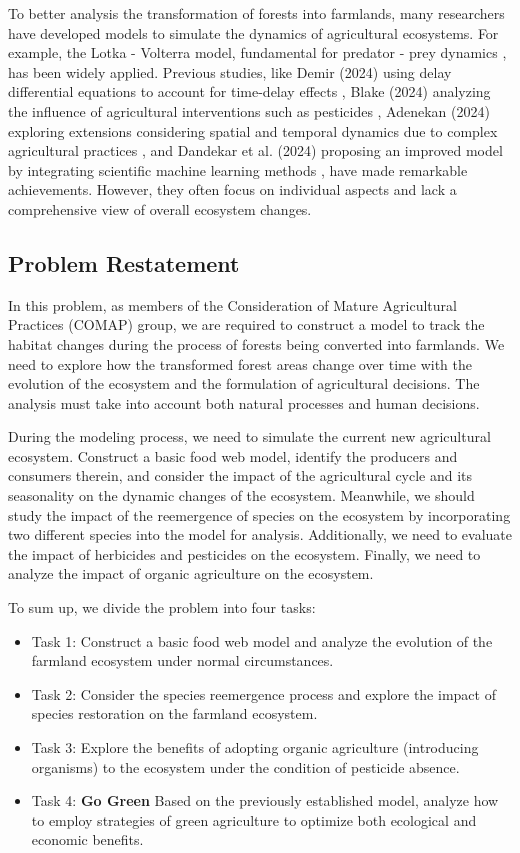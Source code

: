 \documentclass[12pt]{article}  %
\begin{document}
To better analysis the transformation of forests into farmlands, 
many researchers have developed models to simulate the dynamics 
of agricultural ecosystems. For example, 
the Lotka - Volterra model, fundamental for predator - prey dynamics
, has been widely applied. Previous studies, like Demir (2024) 
using delay differential equations to account for time-delay 
effects \cite{Demir2024}, Blake (2024) analyzing the influence of 
agricultural interventions such as pesticides \cite{Blake2024}, 
Adenekan (2024) exploring extensions considering spatial and 
temporal dynamics due to complex agricultural practices 
\cite{Adenekan2024}, and Dandekar et al. (2024) proposing 
an improved model by integrating scientific machine learning 
methods \cite{Dandekar2024}, have made remarkable achievements. 
However, they often focus on individual aspects and lack a 
comprehensive view of overall ecosystem changes.


\subsection{Problem Restatement}
In this problem, as members of the Consideration of Mature Agricultural 
Practices (COMAP) group, we are required to construct a model to track the 
habitat changes during the process of forests being converted into farmlands. 
We need to explore how the transformed forest areas change over time with 
the evolution of the ecosystem and the formulation of agricultural decisions. 
The analysis must take into account both natural processes and human decisions.

During the modeling process, we need to simulate the current new agricultural 
ecosystem. Construct a basic food web model, identify the producers and 
consumers therein, and consider the impact of the agricultural cycle and 
its seasonality on the dynamic changes of the ecosystem. Meanwhile, we should 
study the impact of the reemergence of species on the ecosystem by 
incorporating two different species into the model for analysis. 
Additionally, we need to evaluate the impact of herbicides and pesticides 
on the ecosystem. Finally, we need to analyze the impact of organic 
agriculture on the ecosystem.

To sum up, we divide the problem into four tasks:
\begin{itemize}
\item Task 1: Construct a basic food web model and analyze the evolution of the farmland ecosystem under normal circumstances.
\item Task 2: Consider the species reemergence process and explore the impact of species restoration on the farmland ecosystem.
\item Task 3: Explore the benefits of adopting organic agriculture (introducing organisms) to the ecosystem under the condition of pesticide absence.
\item Task 4: \textbf{Go Green} Based on the previously established model, analyze how to employ strategies of green agriculture to optimize both ecological and economic benefits.
\end{itemize}
\end{document}
